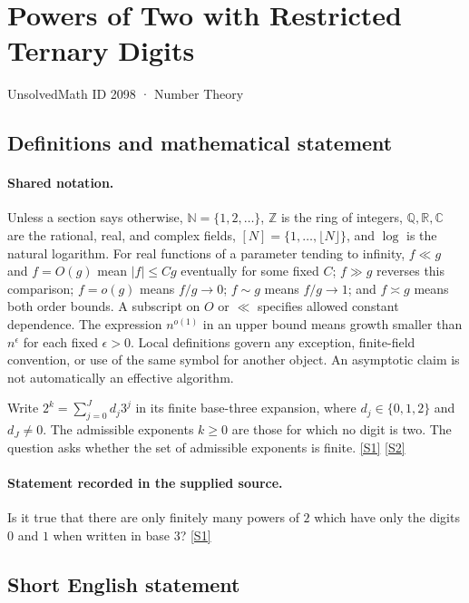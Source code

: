 \documentclass[11pt,a4paper]{article}
\newcommand{\N}{\mathbb{N}}
\newcommand{\Z}{\mathbb{Z}}
\newcommand{\Q}{\mathbb{Q}}
\newcommand{\R}{\mathbb{R}}
\newcommand{\C}{\mathbb{C}}
\newcommand{\sref}[2]{\hyperlink{source:#1:#2}{[S#2]}}
\begin{document}

\setcounter{section}{2097}

\section{Powers of Two with Restricted Ternary Digits}\label{2098}

{\small\sffamily UnsolvedMath ID 2098 · Number Theory}

\subsection{Definitions and mathematical statement}

\paragraph{Shared notation.}Unless a section says otherwise, $\N=\{1,2,\ldots\}$,
$\Z$ is the ring of integers, $\Q,\R,\C$ are the rational, real, and complex
fields, $[N]=\{1,\ldots,\lfloor N\rfloor\}$, and $\log$ is the natural
logarithm. For real functions of a parameter tending to infinity,
$f\ll g$ and $f=O(g)$ mean $|f|\leq Cg$ eventually for some fixed $C$;
$f\gg g$ reverses this comparison; $f=o(g)$ means $f/g\to0$;
$f\sim g$ means $f/g\to1$; and $f\asymp g$ means both order bounds.
A subscript on $O$ or $\ll$ specifies allowed constant dependence.
The expression $n^{o(1)}$ in an upper bound means growth smaller than
$n^\epsilon$ for each fixed $\epsilon>0$. Local definitions govern any
exception, finite-field convention, or use of the same symbol for another
object. An asymptotic claim is not automatically an effective algorithm.



Write $2^k=\sum_{j=0}^{J}d_j3^j$ in its finite base-three expansion, where $d_j\in\{0,1,2\}$ and $d_J\ne0$. The admissible exponents $k\geq0$ are those for which no digit is two. The question asks whether the set of admissible exponents is finite. \sref{2098}{1} \sref{2098}{2}

\paragraph{Statement recorded in the supplied source.}
Is it true that there are only finitely many powers of $2$ which have only the digits $0$ and $1$ when written in base $3$? \sref{2098}{1}

\subsection{Short English statement}
\end{document}
